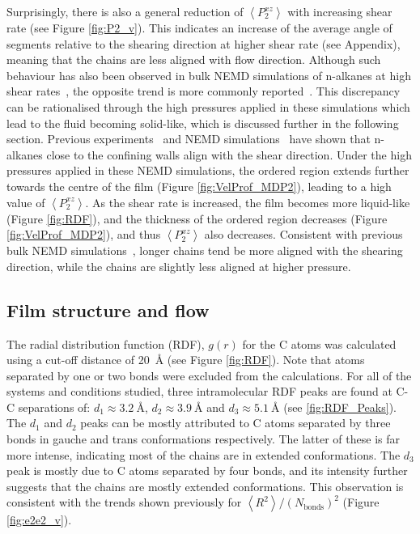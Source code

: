 \documentclass[5p]{elsarticle}
\begin{document}
Surprisingly, there is also a general reduction of $\left<P_{2}^{xz} \right> $ with increasing shear rate (see Figure \ref{fig:P2_v}). This indicates an increase of the average angle of segments relative to the shearing direction at higher shear rate (see Appendix), meaning that the chains are less aligned with flow direction. Although such behaviour has also been observed in bulk NEMD simulations of n-alkanes at high shear rates~\cite{Padilla1992}, the opposite trend is more commonly reported~\cite{Cho2017,Cui1996}. This discrepancy can be rationalised through the high pressures applied in these simulations which lead to the fluid becoming solid-like, which is discussed further in the following section. Previous experiments~\cite{Drummond2002} and NEMD simulations~\cite{Cho2017} have shown that n-alkanes close to the confining walls align with the shear direction. Under the high pressures applied in these NEMD simulations, the ordered region extends further towards the centre of the film (Figure \ref{fig:VelProf_MDP2}), leading to a high value of $\left<P_{2}^{xz} \right> $. As the shear rate is increased, the film becomes more liquid-like (Figure \ref{fig:RDF}), and the thickness of the ordered region decreases (Figure \ref{fig:VelProf_MDP2}), and thus $\left<P_{2}^{xz} \right> $ also decreases. Consistent with previous bulk NEMD simulations~\cite{Cui1996}, longer chains tend be more aligned with the shearing direction, while the chains are slightly less aligned at higher pressure.

\subsection{Film structure and flow}
\label{str}

The radial distribution function (RDF), $g(r)$ for the C atoms was calculated using a cut-off distance of \SI{20}{\angstrom} (see Figure \ref{fig:RDF}). Note that atoms separated by one or two bonds were excluded from the calculations. For all of the systems and conditions studied, three intramolecular RDF peaks are found at C-C separations of: $d_1 \approx \SI{3.2}{\angstrom}$, $d_2 \approx \SI{3.9}{\angstrom}$ and $d_3 \approx \SI{5.1}{\angstrom}$ (see \ref{fig:RDF_Peaks}). The $d_1$ and $d_2$ peaks can be mostly attributed to C atoms separated by three bonds in gauche and trans conformations respectively. The latter of these is far more intense, indicating most of the chains are in extended conformations. The $d_3$ peak is mostly due to C atoms separated by four bonds, and its intensity further suggests that the chains are mostly extended conformations. This observation is consistent with the trends shown previously for $\left< R^2 \right>/\left(N_\text{bonds}\right)^2$ (Figure \ref{fig:e2e2_v}).
\end{document}
